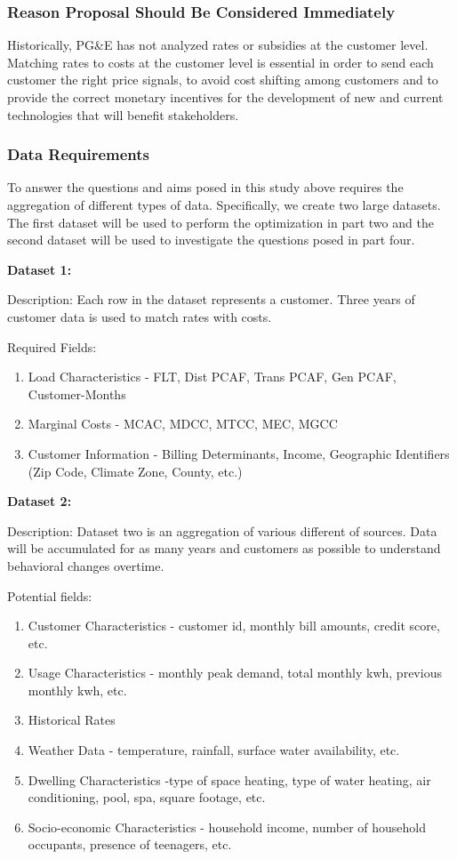 \documentclass[12pt]{article}
\begin{document}
\subsubsection*{Reason Proposal Should Be Considered Immediately}

Historically, PG\&E has not analyzed rates or subsidies at the customer level. Matching rates to costs at the customer level is essential in order to send each customer the right price signals, to avoid cost shifting among customers and to provide the correct monetary incentives for the development of new and current technologies that will benefit stakeholders.

\subsubsection*{Data Requirements}
To answer the questions and aims posed in this study above requires the aggregation of different types of data. Specifically, we create two large datasets. The first dataset will be used to perform the optimization in part two and the second dataset will be used to investigate the questions posed in part four. \newline

\noindent \textbf{Dataset 1:}

Description: Each row in the dataset represents a customer. Three years of customer data is used to match rates with costs.

Required Fields:
\begin{enumerate}
	\item Load Characteristics - FLT, Dist PCAF, Trans PCAF, Gen PCAF, Customer-Months
	\item Marginal Costs - MCAC, MDCC, MTCC, MEC, MGCC
	\item Customer Information - Billing Determinants, Income, Geographic Identifiers (Zip Code, Climate Zone, County, etc.)
\end{enumerate}

\noindent \textbf{Dataset 2:}

Description: Dataset two is an aggregation of various different of sources. Data will be accumulated for as many years and customers as possible to understand behavioral changes overtime.

Potential fields:
\begin{enumerate}
	\item Customer Characteristics - customer id, monthly bill amounts, credit score, etc.
	\item Usage Characteristics - monthly peak demand, total monthly kwh, previous monthly kwh, etc.
	\item Historical Rates
	\item Weather Data - temperature, rainfall, surface water availability, etc.
	\item Dwelling Characteristics -type of space heating, type of water heating, air conditioning, pool, spa, square footage, etc.
	\item Socio-economic Characteristics - household income, number of household occupants, presence of teenagers, etc.
\end{enumerate}
\end{document}
